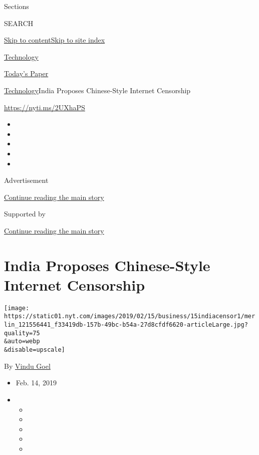 Sections

SEARCH

\protect\hyperlink{site-content}{Skip to
content}\protect\hyperlink{site-index}{Skip to site index}

\href{https://www.nytimes.com/section/technology}{Technology}

\href{https://myaccount.nytimes.com/auth/login?response_type=cookie\&client_id=vi}{}

\href{https://www.nytimes.com/section/todayspaper}{Today's Paper}

\href{/section/technology}{Technology}\textbar{}India Proposes
Chinese-Style Internet Censorship

\href{https://nyti.ms/2UXhaPS}{https://nyti.ms/2UXhaPS}

\begin{itemize}
\item
\item
\item
\item
\item
\end{itemize}

Advertisement

\protect\hyperlink{after-top}{Continue reading the main story}

Supported by

\protect\hyperlink{after-sponsor}{Continue reading the main story}

\hypertarget{india-proposes-chinese-style-internet-censorship}{%
\section{India Proposes Chinese-Style Internet
Censorship}\label{india-proposes-chinese-style-internet-censorship}}

\texttt{[image: https://static01.nyt.com/images/2019/02/15/business/15indiacensor1/merlin\_121556441\_f33419db-157b-49bc-b54a-27d8cfdf6620-articleLarge.jpg?quality=75\\\&auto=webp\\\&disable=upscale]}

By \href{https://www.nytimes.com/by/vindu-goel}{Vindu Goel}

\begin{itemize}
\item
  Feb. 14, 2019
\item
  \begin{itemize}
  \item
  \item
  \item
  \item
  \item
  \end{itemize}
\end{itemize}

